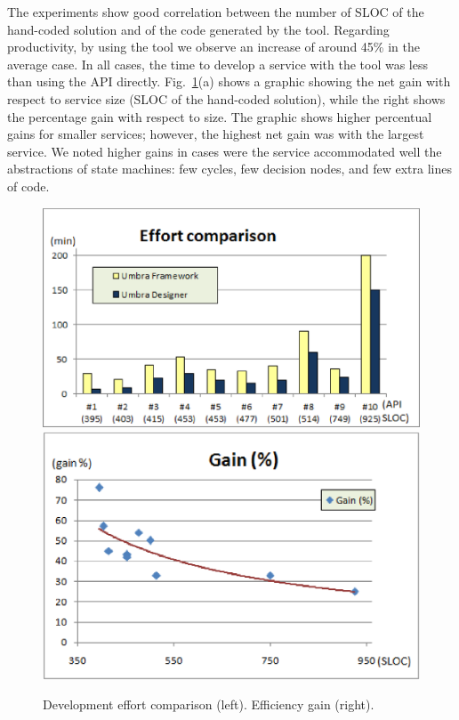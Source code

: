 The experiments show good correlation between the number of SLOC of the hand-coded solution and of the code generated by the tool. 
Regarding productivity, by using the tool we observe an increase of around 45\% in the average case. In all cases, 
the time to develop a service with the tool
was less than using the API directly. Fig.~\ref{fig:graphics}(a) shows a graphic showing the net gain with respect to service size (SLOC
of the hand-coded solution), 
while the right shows the percentage gain with respect to size. The graphic shows higher percentual gains for smaller services; however, the highest net gain was with the 
largest service. We noted higher gains in cases were the service accommodated well the abstractions of state machines: few cycles, few decision
nodes, and few extra lines of code.

\begin{figure}[h!tb]
  \centering
    \includegraphics[scale = 0.35]{figures/effort.eps} %
  \hspace{0.1cm}
    \includegraphics[scale = 0.35]{figures/gain.eps} %
  \caption{Development effort comparison (left). Efficiency gain (right).}
  \label{fig:graphics}
\end{figure}

